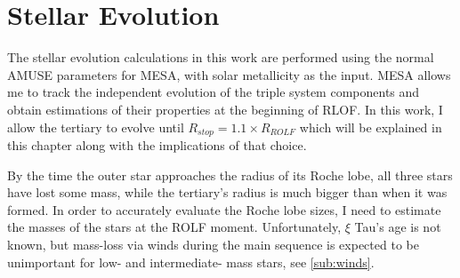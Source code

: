 \section{Stellar Evolution}\label{sec:stellar_evolution}

The stellar evolution calculations in this work are performed using the normal AMUSE parameters for MESA, with solar metallicity as the input.
MESA allows me to track the independent evolution of the triple system components and obtain estimations of their properties at the beginning of RLOF. In this work, I allow the tertiary to evolve until $R_{stop} = 1.1 \times R_{ROLF}$ which will be explained in this chapter along with the implications of that choice.

By the time the outer star approaches the radius of its Roche lobe, all three stars have lost some mass, while the tertiary's radius is much bigger than when it was formed. In order to accurately evaluate the Roche lobe sizes,  I need to estimate the masses of the stars at the ROLF moment. Unfortunately, $\xi$ Tau's age is not known, but mass-loss via winds during the main sequence is expected to be unimportant for low- and intermediate- mass stars, see \cref{sub:winds}.

